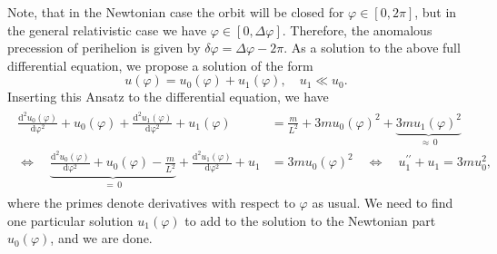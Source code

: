 \documentclass[a4paper,11pt]{article}
\numberwithin{equation}{section}
\begin{document}
{Note, that in the Newtonian case the orbit will be closed for $\varphi \in [0,2\pi]$, but in the general relativistic case we have $\varphi \in [0,\Delta \varphi]$. Therefore, the anomalous precession of perihelion is given by $\delta \varphi = \Delta \varphi - 2\pi$. As a solution to the above full differential equation, we propose a solution of the form \begin{equation}
u(\varphi) = u_0(\varphi) + u_1(\varphi), \quad u_1 \ll u_0.
\end{equation} Inserting this Ansatz to the differential equation, we have \begin{align}
\begin{aligned}
\frac{\mathrm{d}^2u_0(\varphi)}{\mathrm{\mathrm{d}\varphi^2}} + u_0(\varphi) + \frac{\mathrm{d}^2u_1(\varphi)}{\mathrm{\mathrm{d}\varphi^2}} + u_1(\varphi) &= \frac{m}{L^2} + 3mu_0(\varphi)^2 + \underbrace{3mu_1(\varphi)^2}_{\approx \, 0} \\
\Leftrightarrow \quad \underbrace{\frac{\mathrm{d}^2u_0(\varphi)}{\mathrm{\mathrm{d}\varphi^2}} + u_0(\varphi) - \frac{m}{L^2}}_{=\,0} + \frac{\mathrm{d}^2u_1(\varphi)}{\mathrm{\mathrm{d}\varphi^2}} + u_1 &= 3mu_0(\varphi)^2 \quad \Leftrightarrow \quad u_1^{\prime\prime} + u_1 = 3mu_0^2,
\end{aligned}
\end{align} where the primes denote derivatives with respect to $\varphi$ as usual. We need to find one particular solution $u_1(\varphi)$ to add to the solution to the Newtonian part $u_0(\varphi)$, and we are done.

}
\end{document}
